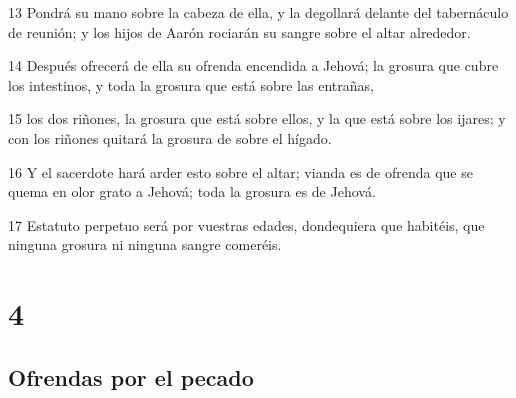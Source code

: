 \par 13 Pondrá su mano sobre la cabeza de ella, y la degollará delante del tabernáculo de reunión; y los hijos de Aarón rociarán su sangre sobre el altar alrededor.
\par 14 Después ofrecerá de ella su ofrenda encendida a Jehová; la grosura que cubre los intestinos, y toda la grosura que está sobre las entrañas,
\par 15 los dos riñones, la grosura que está sobre ellos, y la que está sobre los ijares; y con los riñones quitará la grosura de sobre el hígado.
\par 16 Y el sacerdote hará arder esto sobre el altar; vianda es de ofrenda que se quema en olor grato a Jehová; toda la grosura es de Jehová.
\par 17 Estatuto perpetuo será por vuestras edades, dondequiera que habitéis, que ninguna grosura ni ninguna sangre comeréis.

\chapter{4}

\section*{Ofrendas por el pecado}

